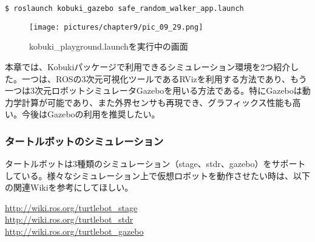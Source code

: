 \begin{lstlisting}[language=ROS]
$ roslaunch kobuki_gazebo safe_random_walker_app.launch
\end{lstlisting}

\begin{figure}[htp]
  \centering
  \texttt{[image: pictures/chapter9/pic\_09\_29.png]}
  \caption{kobuki\_playground.launchを実行中の画面}
\end{figure}


本章では、Kobukiパッケージで利用できるシミュレーション環境を2つ紹介した。一つは、ROSの3次元可視化ツールであるRVizを利用する方法であり、もう一つは3次元ロボットシミュレータGazeboを用いる方法である。特にGazeboは動力学計算が可能であり、また外界センサも再現でき、グラフィックス性能も高い。今後はGazeboの利用を推奨したい。

\subsubsection{タートルボットのシミュレーション}

タートルボットは3種類のシミュレーション（stage、stdr、gazebo）をサポートしている。様々なシミュレーション上で仮想ロボットを動作させたい時は、以下の関連Wikiを参考にしてほしい。

\url{http://wiki.ros.org/turtlebot\_stage}\\
\url{http://wiki.ros.org/turtlebot\_stdr}\\
\url{http://wiki.ros.org/turtlebot\_gazebo}\\

